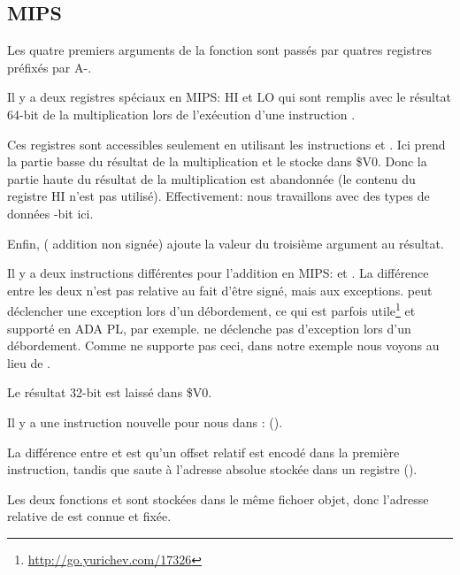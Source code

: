 \subsection{MIPS}



Les quatre premiers arguments de la fonction sont passés par quatres registres préfixés
par A-.


Il y a deux registres spéciaux en MIPS: HI et LO qui sont remplis avec le résultat
64-bit de la multiplication lors de l'exécution d'une instruction .

Ces registres sont accessibles seulement en utilisant les instructions  et .
Ici  prend la partie basse du résultat de la multiplication et le stocke
dans \$V0.
Donc la partie haute du résultat de la multiplication est abandonnée (le contenu
du registre HI n'est pas utilisé).
Effectivement: nous travaillons avec des types de données -bit ici.


Enfin,  ( addition non signée) ajoute la valeur du troisième
argument au résultat.


Il y a deux instructions différentes pour l'addition en MIPS:  et .
La différence entre les deux n'est pas relative au fait d'être signé, mais aux
exceptions.  peut déclencher une exception lors d'un débordement, ce qui
est parfois utile\footnote{\url{http://go.yurichev.com/17326}} et supporté en ADA
\ac{PL}, par exemple.
 ne déclenche pas d'exception lors d'un débordement.
Comme \CCpp ne supporte pas ceci, dans notre exemple nous voyons  au lieu
de .

Le résultat 32-bit est laissé dans \$V0.


Il y a une instruction nouvelle pour nous dans \main:  ().

La différence entre  et  est qu'un offset relatif est encodé
dans la première instruction, tandis que  saute à l'adresse absolue stockée
dans un registre ().

Les deux fonctions \ttf et \main sont stockées dans le même fichoer objet, donc
l'adresse relative de \ttf est connue et fixée.

